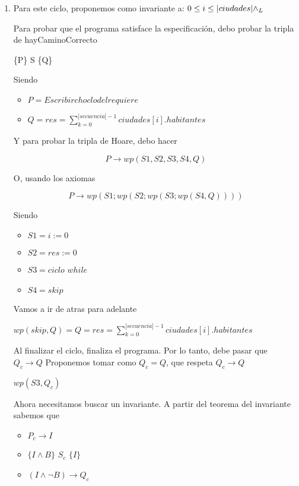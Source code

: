 \documentclass[10pt,a4paper]{article}
\begin{document}
\begin {enumerate}
    \item
	
    Para este ciclo, proponemos como invariante a: $0 \leq i \leq |ciudades| \land _L$

    Para probar que el programa satisface la especificación, debo probar la tripla de hayCaminoCorrecto

    \{P\} S \{Q\}

    Siendo 
    \begin{itemize}
        \item $P = Escribir choclo del requiere$
        \item $Q = res =  \sum\limits_{k=0}^{|secuencia| - 1}{ciudades[i].habitantes}$
    \end{itemize}
    
    Y para probar la tripla de Hoare, debo hacer

    $$P \rightarrow wp(S1,S2,S3,S4, Q)$$

    O, usando los axiomas 

    $$P \rightarrow wp(S1; wp(S2; wp(S3; wp(S4, Q))))$$

    Siendo 
    \begin{itemize}
        \item $S1 = i := 0$
        \item $S2 = res := 0$
        \item $S3 = ciclo$ $while$
        \item $S4 = skip$
    \end{itemize}
    
    Vamos a ir de atras para adelante

    $wp (skip, Q) = Q = res =  \sum\limits_{k=0}^{|secuencia| - 1}{ciudades[i].habitantes}$

    Al finalizar el ciclo, finaliza el programa. Por lo tanto, debe pasar que $Q_{c} \rightarrow Q$
    Proponemos tomar como $Q_{c} = Q$, que respeta $Q_{c} \rightarrow Q $
    
    $wp(S3, Q_{c})$

    Ahora necesitamos buscar un invariante. A partir del teorema del invariante sabemos que 

    \begin{itemize}
        \item $P_{c} \rightarrow I$
        \item $ \{I \land B \}$  $S_{c}$  $\{I\}$
        \item $(I \land \neg B) \rightarrow Q_{c} $
    \end{itemize}
    

\end{enumerate}
\end{document}
